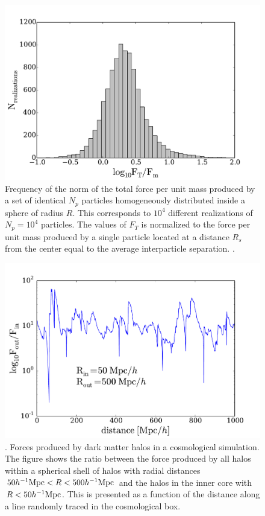 \documentclass{article}
\newcommand{\hMpc}{{\ifmmode{h^{-1}{\rm Mpc}}\else{$h^{-1}$Mpc }\fi}}
\begin{document}
\begin{figure}
\begin{center}
\includegraphics[width=0.8\linewidth,angle=0]{spheres_bulk.pdf}
\caption{\label{fig:sphere_bulk} Frequency of the norm of the total
  force per unit mass produced by a set of identical $N_p$ particles
  homogeneously distributed inside a sphere of radius $R$. This
  corresponds to $10^4$ different realizations of $N_p=10^4$
  particles. The values of $F_T$ is normalized to the force per unit
  mass produced by a single particle located at a distance $R_s$ from
  the center equal to the average interparticle
  separation. \label{fig:sphere_surface}.}  
\end{center}
\end{figure}




\begin{figure}
\begin{center}
\includegraphics[width=0.8\linewidth,angle=0]{trace_nbody_200_1000.pdf}
\caption{\label{fig:trace_nbody}. Forces produced by dark matter halos in a
cosmological simulation. The figure shows the ratio between the force
produced by all halos within a spherical shell of halos with radial
distances $50\hMpc <R<500\hMpc$ and the halos in the inner core with
$R<50\hMpc$. This is presented as a function of the distance along a
line randomly traced in the cosmological box.}
\end{center}
\end{figure}
\end{document}
